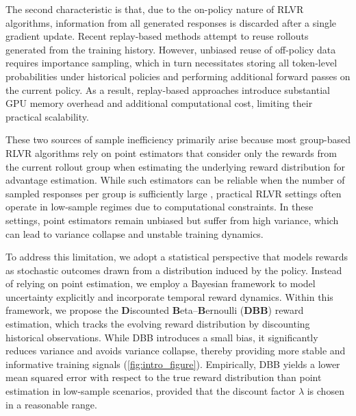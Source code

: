 The second characteristic is that, due to the on-policy nature of RLVR algorithms, information from all generated responses is discarded after a single gradient update. 
Recent replay-based methods \cite{li2025reporeplayenhancedpolicyoptimization, zhan2025exgrpolearningreasonexperience} attempt to reuse rollouts generated from the training history.
However, unbiased reuse of off-policy data requires importance sampling, which in turn necessitates storing all token-level probabilities under historical policies and performing additional forward passes on the current policy. 
As a result, replay-based approaches introduce substantial GPU memory overhead and additional computational cost, limiting their practical scalability.

These two sources of sample inefficiency primarily arise because most group-based RLVR algorithms rely on point estimators that consider only the rewards from the current rollout group when estimating the underlying reward distribution for advantage estimation. 
While such estimators can be reliable when the number of sampled responses per group is sufficiently large \cite{casella2024}, practical RLVR settings often operate in low-sample regimes due to computational constraints.
In these settings, point estimators remain unbiased but suffer from high variance, which can lead to variance collapse and unstable training dynamics.


To address this limitation, we adopt a statistical perspective that models rewards as stochastic outcomes drawn from a distribution induced by the policy. 
Instead of relying on point estimation, we employ a Bayesian framework \cite{gelman1995bayesian} to model uncertainty explicitly and incorporate temporal reward dynamics.
Within this framework, we propose the \textbf{D}iscounted \textbf{B}eta--\textbf{B}ernoulli (\textbf{DBB}) reward estimation, which tracks the evolving reward distribution by discounting historical observations. 
While DBB introduces a small bias, it significantly reduces variance and avoids variance collapse, thereby providing more stable and informative training signals (\cref{fig:intro_figure}). 
Empirically, DBB yields a lower mean squared error with respect to the true reward distribution than point estimation in low-sample scenarios, provided that the discount factor $\lambda$ is chosen in a reasonable range.

